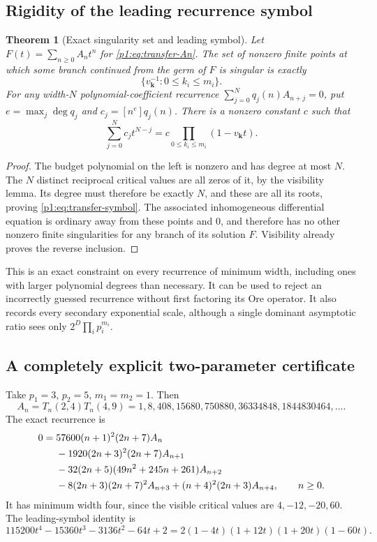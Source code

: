 \documentclass[11pt,a4paper]{article}
\newtheorem{theorem}{Theorem}[section]
\theoremstyle{definition}
\theoremstyle{remark}
\numberwithin{equation}{section}
\begin{document}
\subsection{Rigidity of the leading recurrence symbol}

\begin{theorem}[Exact singularity set and leading symbol]
\label{p1:thm:transfer-symbol}
Let $F(t)=\sum_{n\geq0}A_nt^n$ for \eqref{p1:eq:transfer-An}.  The set of
nonzero finite points at which some branch continued from the germ of $F$
is singular is exactly
\[
 \{v_{\boldsymbol k}^{-1}:0\leq k_i\leq m_i\}.
\]
For any width-$N$ polynomial-coefficient recurrence
$\sum_{j=0}^N q_j(n)A_{n+j}=0$, put
$e=\max_j\deg q_j$ and $c_j=[n^e]q_j(n)$.  There is a nonzero constant
$c$ such that
\begin{equation}\label{p1:eq:transfer-symbol}
 \sum_{j=0}^N c_jt^{N-j}
 =c\prod_{0\leq k_i\leq m_i}(1-v_{\boldsymbol k}t).
\end{equation}
\end{theorem}

\begin{proof}
The budget polynomial on the left is nonzero and has degree at most $N$.
The $N$ distinct reciprocal critical values are all zeros of it, by the
visibility lemma.  Its degree must therefore be exactly $N$, and these
are all its roots, proving \eqref{p1:eq:transfer-symbol}.  The associated
inhomogeneous differential equation is ordinary away from these points
and $0$, and therefore has no other nonzero finite singularities for
any branch of its solution $F$.  Visibility already proves the reverse
inclusion.
\end{proof}

This is an exact constraint on every recurrence of minimum width, including
ones with larger polynomial degrees than necessary.  It can be used to
reject an incorrectly guessed recurrence without first factoring its Ore
operator.  It also records every secondary exponential scale, although a
single dominant asymptotic ratio sees only
$2^D\prod_i p_i^{m_i}$.

\subsection{A completely explicit two-parameter certificate}

Take $p_1=3$, $p_2=5$, $m_1=m_2=1$.  Then
\[
 A_n=T_n(2,4)T_n(4,9)
 =1,8,408,15680,750880,36334848,1844830464,\ldots.
\]
The exact recurrence is
\begin{align}\label{p1:eq:transfer-example-rec}
0={}&57600(n+1)^2(2n+7)A_n\notag\\
 &-1920(2n+3)^2(2n+7)A_{n+1}\notag\\
 &-32(2n+5)(49n^2+245n+261)A_{n+2}\notag\\
 &-8(2n+3)(2n+7)^2A_{n+3}
 +(n+4)^2(2n+3)A_{n+4},\qquad n\geq0.
\end{align}
It has minimum width four, since the visible critical values are
$4,-12,-20,60$.  The leading-symbol identity is
\[
 115200t^4-15360t^3-3136t^2-64t+2
 =2(1-4t)(1+12t)(1+20t)(1-60t).
\]
\end{document}

